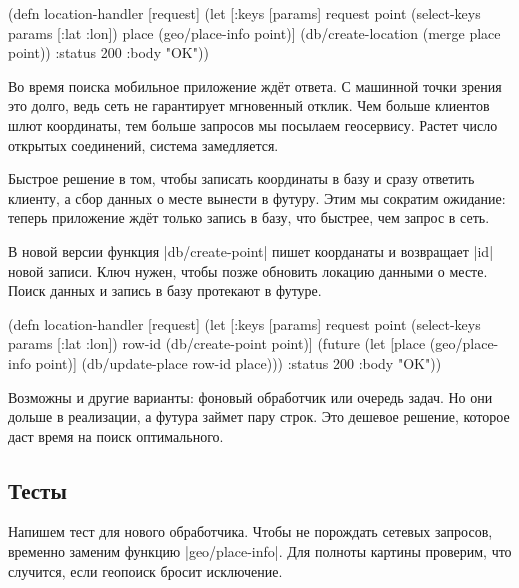 \begin{english}
  \begin{clojure}
(defn location-handler [request]
  (let [{:keys [params]} request
        point (select-keys params [:lat :lon])
        place (geo/place-info point)]
    (db/create-location (merge place point))
    {:status 200 :body "OK"}))
  \end{clojure}
\end{english}

Во время поиска мобильное приложение ждёт ответа. С машинной точки зрения это
долго, ведь сеть не гарантирует мгновенный отклик. Чем больше клиентов шлют
координаты, тем больше запросов мы посылаем геосервису. Растет число
открытых соединений, система замедляется.


Быстрое решение в том, чтобы записать координаты в базу и сразу ответить
клиенту, а сбор данных о месте вынести в футуру. Этим мы сократим ожидание:
теперь приложение ждёт только запись в базу, что быстрее, чем запрос в сеть.

В новой версии функция \spverb|db/create-point| пишет коорданаты и возвращает
\spverb|id| новой записи. Ключ нужен, чтобы позже обновить локацию данными о
месте. Поиск данных и запись в базу протекают в футуре.

\begin{english}
  \begin{clojure}
(defn location-handler
  [request]
  (let [{:keys [params]} request
        point (select-keys params [:lat :lon])
        row-id (db/create-point point)]
    (future
      (let [place (geo/place-info point)]
        (db/update-place row-id place)))
    {:status 200 :body "OK"}))
  \end{clojure}
\end{english}

Возможны и другие варианты: фоновый обработчик или очередь задач. Но они дольше
в реализации, а футура займет пару строк. Это дешевое решение, которое даст
время на поиск оптимального.

\subsection{Тесты}


Напишем тест для нового обработчика. Чтобы не порождать сетевых запросов,
временно заменим функцию \spverb|geo/place-info|. Для полноты картины проверим,
что случится, если геопоиск бросит исключение.


